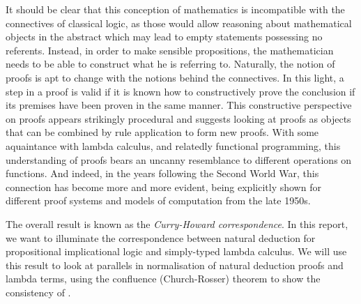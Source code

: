 It should be clear that this conception of mathematics is incompatible with the
connectives of classical logic, as those would allow reasoning about
mathematical objects in the abstract which may lead to empty statements
possessing no referents. Instead, in order to make sensible propositions, the
mathematician needs to be able to construct what he is referring to. Naturally,
the notion of proofs is apt to change with the notions behind the connectives.
In this light, a step in a proof is valid if it is known how to constructively
prove the conclusion if its premises have been proven in the same manner. This
constructive perspective on proofs appears strikingly procedural and suggests
looking at proofs as objects that can be combined by rule application to form
new proofs. With some aquaintance with lambda calculus, and relatedly functional
programming, this understanding of proofs bears an uncanny resemblance to
different operations on functions. And indeed, in the years following the Second
World War, this connection has become more and more evident, being explicitly
shown for different proof systems and models of computation from the late 1950s.

The overall result is known as the \textit{Curry-Howard correspondence}. In this
report, we want to illuminate the correspondence between natural deduction for
propositional implicational logic and simply-typed lambda calculus. We will use
this result to look at parallels in normalisation of natural deduction proofs
and lambda terms, using the confluence (Church-Rosser) theorem to show the
consistency of \implnpi.
